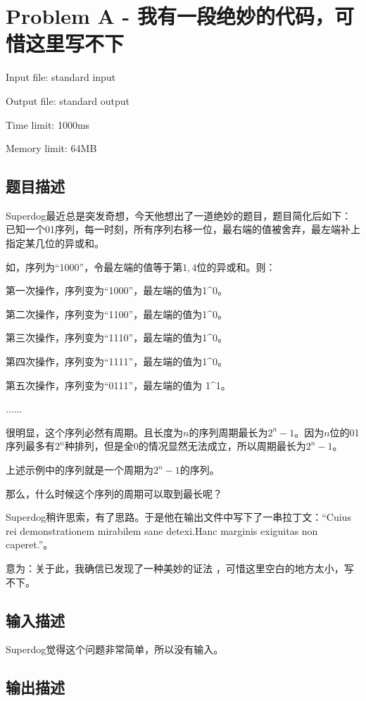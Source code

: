 \newpage
\section{Problem A - 我有一段绝妙的代码，可惜这里写不下}
{ \limitfont{}
Input file: standard input \par
Output file: standard output \par
Time limit: 1000ms \par
Memory limit: 64MB \par
}
\subsection*{题目描述}

Superdog最近总是突发奇想，今天他想出了一道绝妙的题目，题目简化后如下：已知一个01序列，每一时刻，所有序列右移一位，最右端的值被舍弃，最左端补上指定某几位的异或和。

如，序列为“1000”，令最左端的值等于第$1,4$位的异或和。则：

第一次操作，序列变为“1000”，最左端的值为1\^{}0。

第二次操作，序列变为“1100”，最左端的值为1\^{}0。

第三次操作，序列变为“1110”，最左端的值为1\^{}0。

第四次操作，序列变为“1111”，最左端的值为1\^{}0。

第五次操作，序列变为“0111”，最左端的值为 1\^{}1。

......

很明显，这个序列必然有周期。且长度为$n$的序列周期最长为$2^n-1$。因为$n$位的01序列最多有$2^n$种排列，但是全0的情况显然无法成立，所以周期最长为$2^n-1$。

上述示例中的序列就是一个周期为$2^n-1$的序列。

那么，什么时候这个序列的周期可以取到最长呢？

Superdog稍许思索，有了思路。于是他在输出文件中写下了一串拉丁文：``Cuius rei demonstrationem mirabilem sane detexi.Hanc marginis exiguitas non caperet.''。

意为：关于此，我确信已发现了一种美妙的证法 ，可惜这里空白的地方太小，写不下。

\subsection*{输入描述}

Superdog觉得这个问题非常简单，所以没有输入。

\subsection*{输出描述}

